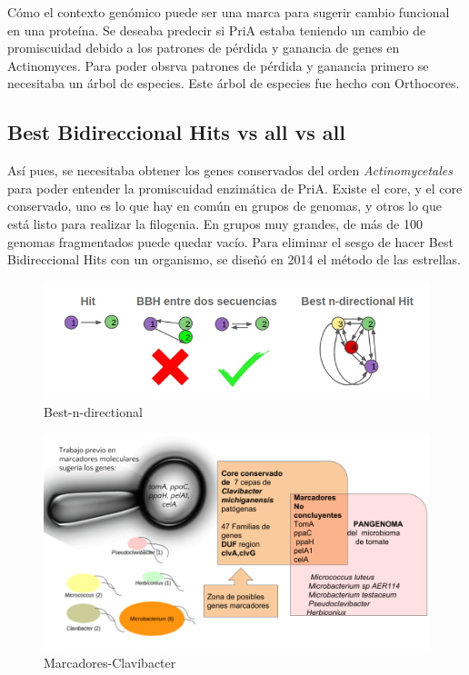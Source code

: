 \documentclass[]{article}
\begin{document}
Cómo el contexto genómico puede ser una marca para sugerir cambio
funcional en una proteína. Se deseaba predecir si PriA estaba teniendo
un cambio de promiscuidad debido a los patrones de pérdida y ganancia de
genes en Actinomyces. Para poder obsrva patrones de pérdida y ganancia
primero se necesitaba un árbol de especies. Este árbol de especies fue
hecho con Orthocores.

\subsection{Best Bidireccional Hits vs all vs
all}\label{best-bidireccional-hits-vs-all-vs-all}

Así pues, se necesitaba obtener los genes conservados del orden
\emph{Actinomycetales} para poder entender la promiscuidad enzimática de
PriA. Existe el core, y el core conservado, uno es lo que hay en común
en grupos de genomas, y otros lo que está listo para realizar la
filogenia. En grupos muy grandes, de más de 100 genomas fragmentados
puede quedar vacío. Para eliminar el sesgo de hacer Best Bidireccional
Hits con un organismo, se diseñó en 2014 el método de las estrellas.

\begin{figure}[h!tbp]
\centering
\includegraphics[angle = 0,scale = 1]{chapter1/Best-n-directional.png}
\caption[Best-n-directional]{\normalsize{Best-n-directional}}
\label{fig:Best-n-directional}
\end{figure}

\begin{figure}[h!tbp]
\centering
\includegraphics[angle = 0,scale = 1]{chapter1/Marcadores-Clavibacter.png}
\caption[Marcadores-Clavibacter]{\normalsize{Marcadores-Clavibacter}}
\label{fig:Marcadores-Clavibacter}
\end{figure}
\end{document}
